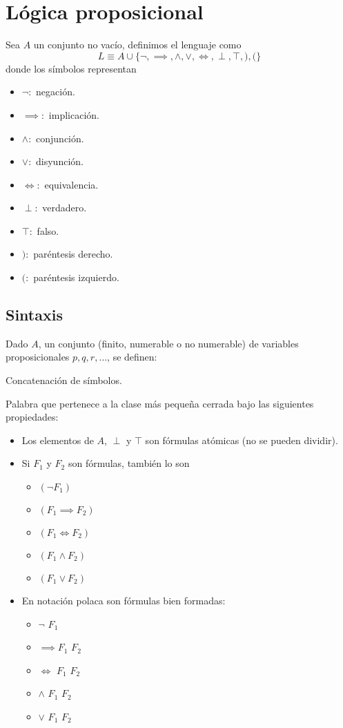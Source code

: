 \section{Lógica proposicional}
Sea $A$ un conjunto no vacío, definimos el lenguaje como
$$L \equiv A\cup\{\neg,\implies, \wedge, \vee, \iff, \perp, \top, ), ( \}$$
donde los símbolos representan
\begin{itemize}
	\item $\neg:$ negación.
	\item $\implies:$ implicación.
	\item $\wedge:$ conjunción.
	\item $\vee:$ disyunción.
	\item $\iff:$ equivalencia.
	\item $\perp:$ verdadero.
	\item $\top:$ falso.
	\item $):$ paréntesis derecho.
	\item $(:$ paréntesis izquierdo.
\end{itemize}

\subsection{Sintaxis}
Dado $A$, un conjunto (finito, numerable o no numerable) de variables proposicionales $p, q, r, \hdots$, se definen:

\begin{defn}[Palabra]
	Concatenación de símbolos.
\end{defn}

\begin{defn}
	Palabra que pertenece a la clase más pequeña cerrada bajo las siguientes propiedades:
	\begin{itemize}
		\item Los elementos de $A$, $\perp$ y $\top$ son fórmulas atómicas (no se pueden dividir).
		\item Si $F_1$ y $F_2$ son fórmulas, también lo son
		\begin{itemize}
			\item $(\neg F_1)$
			\item $(F_1\implies F_2)$
			\item $(F_1\iff F_2)$
			\item $(F_1\wedge F_2)$
			\item $(F_1\vee F_2)$
		\end{itemize}
		\newpage
		\item En notación polaca son fórmulas bien formadas:
		\begin{itemize}
			\item $\neg$ $F_1$
			\item $\implies F_1$ $F_2$
			\item $\iff$ $F_1$ $F_2$
			\item $\wedge$ $F_1$ $F_2$
			\item $\vee$ $F_1$ $F_2$
		\end{itemize}
	\end{itemize}
\end{defn}

